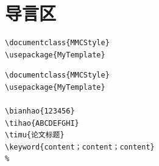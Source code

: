 \documentclass{MMCStyle}
\begin{document}
\appendix

\section{导言区}

\begin{solution}
\begin{verbatim}
\documentclass{MMCStyle}
\usepackage{MyTemplate}
\end{verbatim}
\end{solution}

\begin{solution}[完整导言区：]
\begin{verbatim}
\documentclass{MMCStyle}
\usepackage{MyTemplate}

\bianhao{123456}
\tihao{ABCDEFGHI}
\timu{论文标题}
\keyword{content；content；content}
% 

\end{verbatim}
\end{solution}
\end{document}
